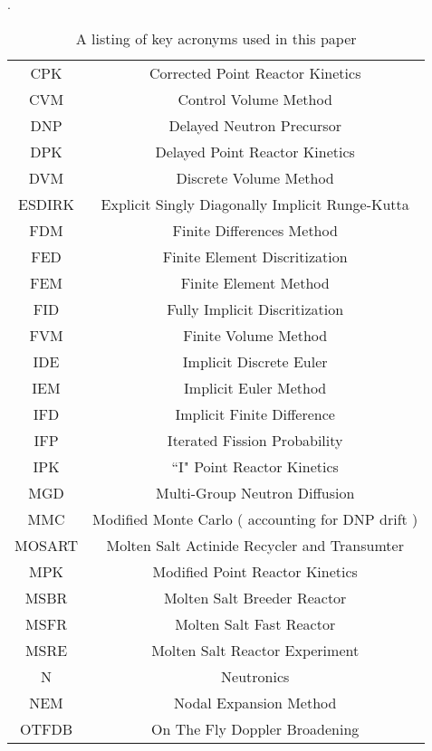 \documentclass[review]{elsarticle}
\begin{document}
\begin{table}[h]
    \caption{A listing of key acronyms used in this paper}.
    \label{tbl:nomen}
    \begin{center}
        \begin{tabular}{|c c|}
            \hline
            CPK & Corrected Point Reactor Kinetics \\
            CVM & Control Volume Method \\
            DNP & Delayed Neutron Precursor \\
            DPK & Delayed Point Reactor Kinetics \\
            DVM & Discrete Volume Method \\
            ESDIRK & Explicit Singly Diagonally Implicit Runge-Kutta \\
            FDM & Finite Differences Method \\
            FED & Finite Element Discritization \\
            FEM & Finite Element Method \\
            FID & Fully Implicit Discritization \\
            FVM & Finite Volume Method \\
            IDE & Implicit Discrete Euler \\
            IEM & Implicit Euler Method \\
            IFD & Implicit Finite Difference \\
            IFP & Iterated Fission Probability \\
            IPK & ``I" Point Reactor Kinetics \\
            MGD & Multi-Group Neutron Diffusion \\
            MMC & Modified Monte Carlo ( accounting for DNP drift ) \\
            MOSART & Molten Salt Actinide Recycler and Transumter \\
            MPK & Modified Point Reactor Kinetics \\
            MSBR & Molten Salt Breeder Reactor \\
            MSFR & Molten Salt Fast Reactor \\
            MSRE & Molten Salt Reactor Experiment \\
            N & Neutronics \\
            NEM & Nodal Expansion Method \\
            OTFDB & On The Fly Doppler Broadening \\

\end{tabular}
\end{center}
\end{table}
\end{document}
